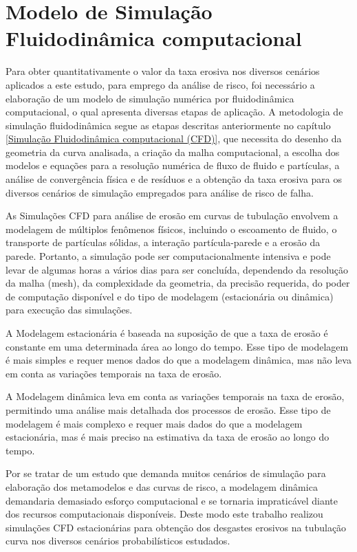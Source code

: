 \section{Modelo de Simulação Fluidodinâmica computacional}

Para obter quantitativamente o valor da taxa erosiva nos diversos cenários aplicados a este estudo, para emprego da análise de risco, foi necessário a elaboração de um modelo de simulação numérica por fluidodinâmica computacional, o qual apresenta diversas etapas de aplicação. A metodologia de simulação fluidodinâmica segue as etapas descritas anteriormente no capítulo \ref{Simulação Fluidodinâmica computacional (CFD)}, que necessita do desenho da geometria da curva analisada, a criação da malha computacional, a escolha dos modelos e equações para a resolução numérica de fluxo de fluido e partículas, a análise de convergência física e de resíduos e a obtenção da taxa erosiva para os diversos cenários de simulação empregados para análise de risco de falha.

\vspace{1cm}


As Simulações CFD para análise de erosão em curvas de tubulação envolvem a modelagem de múltiplos fenômenos físicos, incluindo o escoamento de fluido, o transporte de partículas sólidas, a interação partícula-parede e a erosão da parede. Portanto, a simulação pode ser computacionalmente intensiva e pode levar de algumas horas a vários dias para ser concluída, dependendo da resolução da malha (mesh), da complexidade da geometria, da precisão requerida, do poder de computação disponível e do tipo de modelagem (estacionária ou dinâmica) para execução das simulações. 

A Modelagem estacionária é baseada na suposição de que a taxa de erosão é constante em uma determinada área ao longo do tempo. Esse tipo de modelagem é mais simples e requer menos dados do que a modelagem dinâmica, mas não leva em conta as variações temporais na taxa de erosão. 

A Modelagem dinâmica leva em conta as variações temporais na taxa de erosão, permitindo uma análise mais detalhada dos processos de erosão. Esse tipo de modelagem é mais complexo e requer mais dados do que a modelagem estacionária, mas é mais preciso na estimativa da taxa de erosão ao longo do tempo. 

Por se tratar de um estudo que demanda muitos cenários de simulação para elaboração dos metamodelos e das curvas de risco, a modelagem dinâmica demandaria demasiado esforço computacional e se tornaria impraticável diante dos recursos computacionais disponíveis. Deste modo este trabalho realizou simulações CFD estacionárias para obtenção dos desgastes erosivos na tubulação curva nos diversos cenários probabilísticos estudados.


